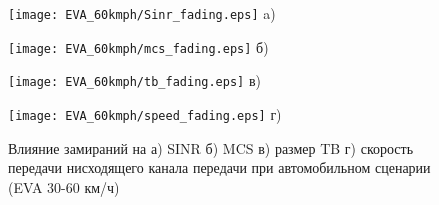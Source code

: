\begin{figure} [!h]
\begin{minipage}[h]{0.47\linewidth}
\center
\texttt{[image: EVA\_60kmph/Sinr\_fading.eps]} a) \\
\end{minipage}
\hfill
\begin{minipage}[h]{0.47\linewidth}
\center
\texttt{[image: EVA\_60kmph/mcs\_fading.eps]} б) \\
\end{minipage}
\vfill
\begin{minipage}[h]{0.47\linewidth}
\center
\texttt{[image: EVA\_60kmph/tb\_fading.eps]} в) \\
\end{minipage}
\hfill
\begin{minipage}[h]{0.47\linewidth}
\center
\texttt{[image: EVA\_60kmph/speed\_fading.eps]} г) \\
\end{minipage}
\caption{Влияние замираний на а) SINR б) MCS в) размер TB г) скорость передачи нисходящего канала передачи при автомобильном сценарии (EVA 30-60 км/ч)}
\label{img:EVA_60kmph}
\end{figure}



